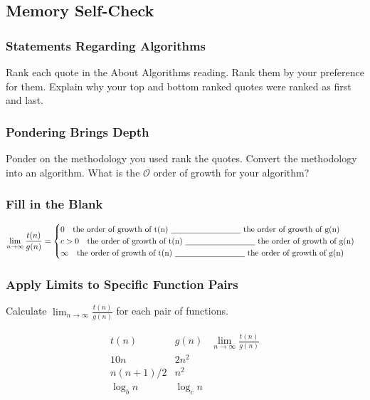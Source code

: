 \documentclass[12pt]{amsart}
\begin{document}
\subsection{Memory Self-Check}

\subsubsection{Statements Regarding Algorithms}
Rank each quote in the About Algorithms reading. Rank them by your preference for them. Explain why your top and bottom ranked quotes were ranked as first and last.
\subsubsection{Pondering Brings Depth}
Ponder on the methodology you used rank the quotes. Convert the methodology into an algorithm. What is the $\mathcal{O}$ order of growth for your algorithm?

\subsubsection{Fill in the Blank}

\[ \lim_{n \rightarrow \infty} \frac{t(n)}{g(n)} = \begin{cases}
    0\quad \text{the order of growth of t(n) \underline{\hspace{3cm}} the order of growth of g(n)}\\
    c>0\quad\text{the order of growth of t(n) \underline{\hspace{3cm}} the order of growth of g(n)}\\
    \infty \quad  \text{the order of growth of t(n) \underline{\hspace{3cm}} the order of growth of g(n)}
\end{cases} 
\]

\subsubsection{Apply Limits to Specific Function Pairs}
Calculate $\lim_{n \rightarrow \infty} \frac{t(n)}{g(n)}$ for each pair of functions.  

\[\begin{array}{lcl}
     t(n) & g(n) & \lim_{n \rightarrow \infty} \frac{t(n)}{g(n)}\\ \hline
     10n   & 2n^2 \\
     n(n+1)/2  & n^2 \\
     \log_{b}n  & \log_{c}n 
     \end{array}\]
\end{document}
